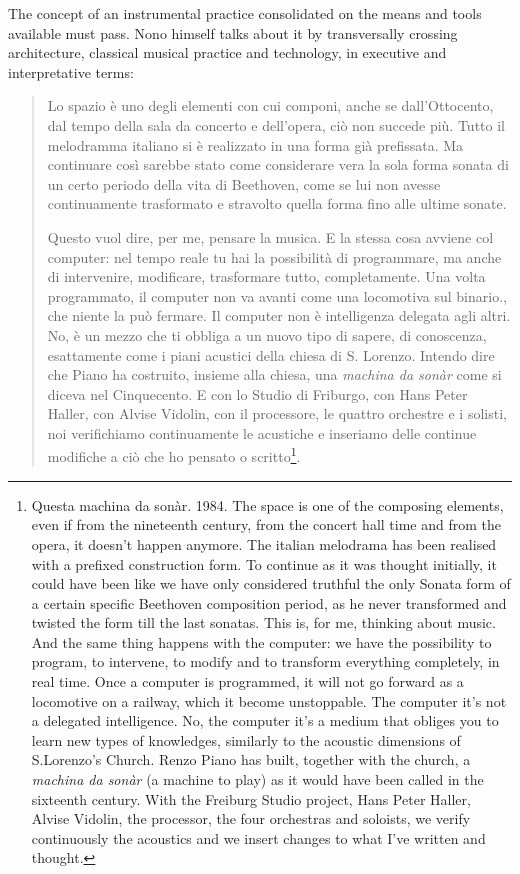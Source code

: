 \documentclass[twoside,a4paper]{article}
\begin{document}
The concept of an instrumental practice consolidated on the means and tools available must pass. Nono himself talks about it by transversally crossing architecture, classical musical practice and technology, in executive and interpretative terms:

\begin{quote}
Lo spazio è uno degli elementi con cui componi, anche se dall'Ottocento, dal tempo della sala da concerto e dell'opera, ciò non succede più. 
Tutto il melodramma italiano si è realizzato in una forma già prefissata. Ma continuare così sarebbe stato come considerare vera la sola forma sonata di un certo periodo della vita di Beethoven, come se lui non avesse continuamente trasformato e stravolto quella forma fino alle ultime sonate. 

Questo vuol dire, per me, pensare la musica. E la stessa cosa avviene col computer: nel tempo reale tu hai la possibilità di programmare, ma anche di intervenire, modificare, trasformare tutto, completamente. Una volta programmato, il computer non va avanti come una locomotiva sul binario., che niente la può fermare. Il computer non è intelligenza delegata agli altri. No, è un mezzo che ti obbliga a un nuovo tipo di sapere, di conoscenza, esattamente come i piani acustici della chiesa di S. Lorenzo. Intendo dire che Piano ha costruito, insieme alla chiesa, una \emph{machina da sonàr} come si diceva nel Cinquecento. E con lo Studio di Friburgo, con Hans Peter Haller, con Alvise Vidolin, con il processore, le quattro orchestre e i solisti, noi verifichiamo continuamente le acustiche e inseriamo delle continue modifiche a ciò che ho pensato o scritto\footnote{Questa machina da sonàr. 1984. The space is one of the composing elements, even if from the nineteenth century, from the concert hall time and from the opera, it doesn’t happen anymore. The italian melodrama has been realised with a prefixed construction form. To continue as it was thought initially, it could have been like we have only considered truthful the only Sonata form of a certain specific Beethoven composition period, as he never transformed and twisted the form till the last sonatas. This is, for me, thinking about music. And the same thing happens with the computer: we have the possibility to program, to intervene, to modify and to transform everything completely, in real time. Once a computer is programmed, it will not go forward as a locomotive on a railway, which it become unstoppable. The computer it’s not a delegated intelligence. No, the computer it’s a medium that obliges you to learn new types of knowledges, similarly to the acoustic dimensions of S.Lorenzo’s Church. Renzo Piano has built, together with the church, a \emph{machina da sonàr} (a machine to play) as it would have been called in the sixteenth century. With the Freiburg Studio project, Hans Peter Haller, Alvise Vidolin, the processor, the four orchestras and soloists, we verify continuously the acoustics and we insert changes to what I’ve written and thought.}. 
\end{quote}
\end{document}
